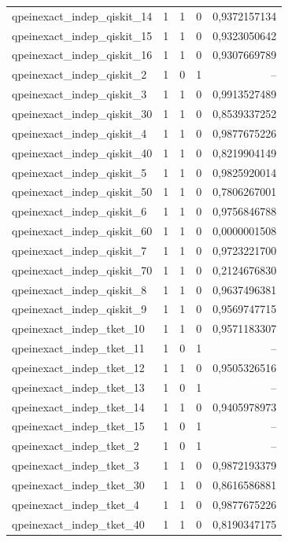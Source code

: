 \begin{longtable}{lrrrr}
qpeinexact\_indep\_qiskit\_14 & 1 & 1 & 0 & 0,9372157134 \\
qpeinexact\_indep\_qiskit\_15 & 1 & 1 & 0 & 0,9323050642 \\
qpeinexact\_indep\_qiskit\_16 & 1 & 1 & 0 & 0,9307669789 \\
qpeinexact\_indep\_qiskit\_2 & 1 & 0 & 1 & -- \\
qpeinexact\_indep\_qiskit\_3 & 1 & 1 & 0 & 0,9913527489 \\
qpeinexact\_indep\_qiskit\_30 & 1 & 1 & 0 & 0,8539337252 \\
qpeinexact\_indep\_qiskit\_4 & 1 & 1 & 0 & 0,9877675226 \\
qpeinexact\_indep\_qiskit\_40 & 1 & 1 & 0 & 0,8219904149 \\
qpeinexact\_indep\_qiskit\_5 & 1 & 1 & 0 & 0,9825920014 \\
qpeinexact\_indep\_qiskit\_50 & 1 & 1 & 0 & 0,7806267001 \\
qpeinexact\_indep\_qiskit\_6 & 1 & 1 & 0 & 0,9756846788 \\
qpeinexact\_indep\_qiskit\_60 & 1 & 1 & 0 & 0,0000001508 \\
qpeinexact\_indep\_qiskit\_7 & 1 & 1 & 0 & 0,9723221700 \\
qpeinexact\_indep\_qiskit\_70 & 1 & 1 & 0 & 0,2124676830 \\
qpeinexact\_indep\_qiskit\_8 & 1 & 1 & 0 & 0,9637496381 \\
qpeinexact\_indep\_qiskit\_9 & 1 & 1 & 0 & 0,9569747715 \\
qpeinexact\_indep\_tket\_10 & 1 & 1 & 0 & 0,9571183307 \\
qpeinexact\_indep\_tket\_11 & 1 & 0 & 1 & -- \\
qpeinexact\_indep\_tket\_12 & 1 & 1 & 0 & 0,9505326516 \\
qpeinexact\_indep\_tket\_13 & 1 & 0 & 1 & -- \\
qpeinexact\_indep\_tket\_14 & 1 & 1 & 0 & 0,9405978973 \\
qpeinexact\_indep\_tket\_15 & 1 & 0 & 1 & -- \\
qpeinexact\_indep\_tket\_2 & 1 & 0 & 1 & -- \\
qpeinexact\_indep\_tket\_3 & 1 & 1 & 0 & 0,9872193379 \\
qpeinexact\_indep\_tket\_30 & 1 & 1 & 0 & 0,8616586881 \\
qpeinexact\_indep\_tket\_4 & 1 & 1 & 0 & 0,9877675226 \\
qpeinexact\_indep\_tket\_40 & 1 & 1 & 0 & 0,8190347175 \\

\end{longtable}
